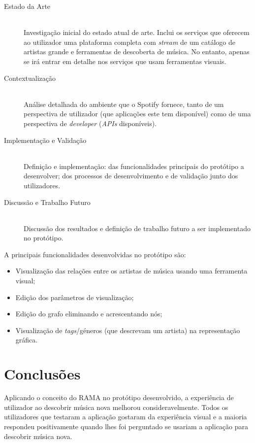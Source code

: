 \documentclass[twocolumn]{article}
\begin{document}
  \begin{description}
    \item[Estado da Arte] \hfill \\
      Investigação inicial do estado atual de arte.
    Inclui os serviços que oferecem ao utilizador uma plataforma completa com \emph{stream} de um catálogo de artistas grande e ferramentas de descoberta de música.
    No entanto, apenas se irá entrar em detalhe nos serviços que usam ferramentas visuais.

    \item[Contextualização] \hfill \\
      Análise detalhada do ambiente que o Spotify fornece, tanto de um perspectiva de utilizador (que aplicações este tem disponível) como de uma perspectiva de \emph{developer} (\emph{APIs} disponíveis).

    \item[Implementação e Validação] \hfill \\
      Definição e implementação: das funcionalidades principais do protótipo a desenvolver; dos processos de desenvolvimento e de validação junto dos utilizadores.

    \item[Discussão e Trabalho Futuro] \hfill \\
      Discussão dos resultados e definição de trabalho futuro a ser implementado no protótipo.
  \end{description}

  A principais funcionalidades desenvolvidas no protótipo são:

  \begin{itemize}
    \item Visualização das relações entre os artistas de música usando uma ferramenta visual;
    \item Edição dos parâmetros de visualização;
    \item Edição do grafo eliminando e acrescentando nós;
    \item Visualização de \emph{tags}/géneros (que descrevam um artista) na representação gráfica.
  \end{itemize}


\section{Conclusões}\label{sec:conclui}

  Aplicando o conceito do RAMA no protótipo desenvolvido, a experiência de utilizador ao descobrir música nova melhorou consideravelmente.
  Todos os utilizadores que testaram a aplicação gostaram da experiência visual e a maioria respondeu positivamente quando lhes foi perguntado se usariam a aplicação para descobrir música nova.



\end{document}
